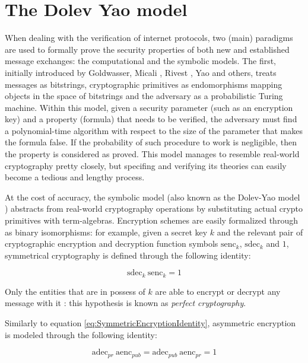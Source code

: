 \documentclass[fleqn,10pt]{SelfArx} %
\begin{document}
\section{The Dolev Yao model}\label{sec:SymbolicModel}

When dealing with the verification of internet protocols, two (main) paradigms are used to formally prove the security properties of both new and established message exchanges: the computational and the symbolic models. The first, initially introduced by Goldwasser, Micali \cite{goldwasser}, Rivest \cite{rivest}, Yao \cite{yao} and others, treats messages as bitstrings, cryptographic primitives as endomorphisms mapping objects in the space of bitstrings and the adversary as a probabilistic Turing machine. Within this model, given a security parameter (such as an encryption key) and a property (formula) that needs to be verified, the adversary must find a polynomial-time algorithm with respect to the size of the parameter that makes the formula false. If the probability of such procedure to work is negligible, then the property is considered as proved. This model manages to resemble real-world cryptography pretty closely, but specifing and verifying its theories can easily become a tedious and lengthy process.

At the cost of accuracy, the symbolic model (also known as the Dolev-Yao model \cite{DolevYao}) abstracts from real-world cryptography operations by substituting actual crypto primitives with term-algebras. Encryption schemes are easily formalized through as binary isomorphisms: for example, given a secret key $k$ and the relevant pair of cryptographic encryption and decryption function symbols $\textrm{senc}_k$, $\textrm{sdec}_k$ and $1$, symmetrical cryptography is defined through the following identity:

\begin{equation}\label{eq:SymmetricEncryptionIdentity}
    \textrm{sdec}_k\ \textrm{senc}_k = 1
\end{equation}

Only the entities that are in possess of $k$ are able to encrypt or decrypt any message with it \cite{BBSecurityProtocolVerification}: this hypothesis is known as \textit{perfect cryptography}.

Similarly to equation \ref{eq:SymmetricEncryptionIdentity}, asymmetric encryption is modeled through the following identity:

\begin{equation}\label{eq:AsymmetricEncryptionIdentity}
    \textrm{adec}_{pr}\ \textrm{aenc}_{pub} = \textrm{adec}_{pub}\ \textrm{aenc}_{pr} = 1
\end{equation}
\end{document}

